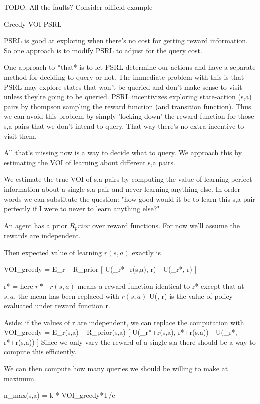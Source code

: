 TODO:
All the faults?
Consider oilfield example


Greedy VOI PSRL
---------

PSRL is good at exploring when there's no cost for getting reward information. So one approach is to modify PSRL to adjust for the query cost. 

One approach to *that* is to let PSRL determine our actions and have a separate method for deciding to query or not. The immediate problem with this is that PSRL may explore states that won't be queried and don't make sense to visit unless they're going to be queried. PSRL incentivizes exploring state-action (s,a) pairs by thompson sampling the reward function (and transition function). Thus we can avoid this problem by simply 'locking down' the reward function for those s,a pairs that we don't intend to query. That way there's no extra incentive to visit them.

All that's missing now is a way to decide what to query. We approach this by estimating the VOI of learning about different s,a pairs. 

We estimate the true VOI of s,a pairs by computing the value of learning perfect information about a single s,a pair and never learning anything else. 
In order words we can substitute the question: "how good would it be to learn this s,a pair perfectly if I were to never to learn anything else?"

An agent has a prior $R_prior$ over reward functions. For now we'll assume the rewards are independent. 

Then expected value of learning $r(s,a)$ exactly is

VOI_greedy = E_{r ~ R_prior}  [ 
  U(\pi_r*+r(s,a), r) - 
  U(\pi_r*,  r) 
  ]

r* = \mean[r]
here $ r* + r(s,a) $ means a reward function identical to r* except that at $s,a$, the mean has been replaced with $r(s,a)$
U(\pi, r) is the value of policy \pi evaluated under reward function r.
 
Aside: if the values of r are independent, we can replace the computation with
  VOI_greedy = E_{r(s,a) ~ R_prior(s,a)}  [ 
    U(\pi_r*+r(s,a), r*+r(s,a)) - 
    U(\pi_r*,  r*+r(s,a)) 
    ]
  Since we only vary the reward of a single s,a there should be a way to compute this efficiently.

We can then compute how many queries we should be willing to make at maximum.

n_max(s,a) = k * VOI_greedy*T/c 

